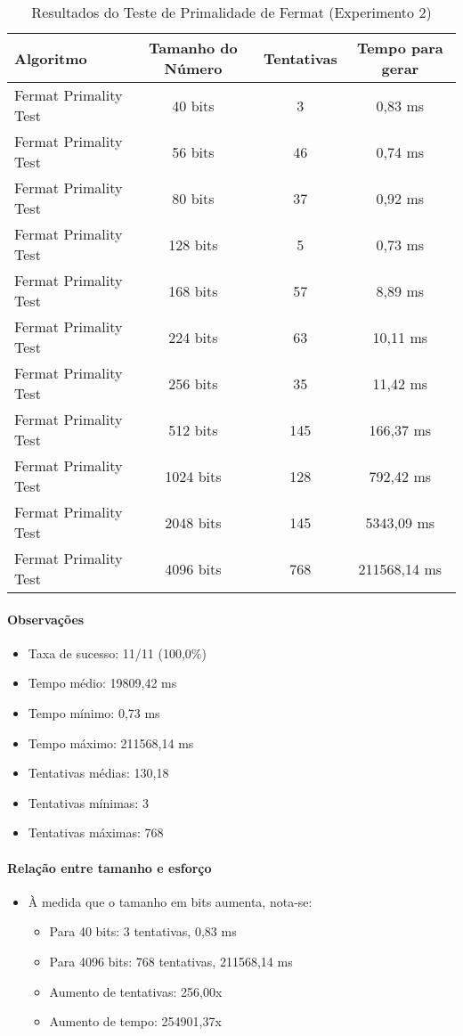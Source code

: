 \begin{table}[H]
\centering
\caption{Resultados do Teste de Primalidade de Fermat (Experimento 2)}
\label{tab:fermat-exp2}
\begin{tabular}{|l|c|c|c|}
\hline
\textbf{Algoritmo} & \textbf{Tamanho do Número} & \textbf{Tentativas} & \textbf{Tempo para gerar} \\
\hline
Fermat Primality Test & 40 bits & 3 & 0,83 ms \\
Fermat Primality Test & 56 bits & 46 & 0,74 ms \\
Fermat Primality Test & 80 bits & 37 & 0,92 ms \\
Fermat Primality Test & 128 bits & 5 & 0,73 ms \\
Fermat Primality Test & 168 bits & 57 & 8,89 ms \\
Fermat Primality Test & 224 bits & 63 & 10,11 ms \\
Fermat Primality Test & 256 bits & 35 & 11,42 ms \\
Fermat Primality Test & 512 bits & 145 & 166,37 ms \\
Fermat Primality Test & 1024 bits & 128 & 792,42 ms \\
Fermat Primality Test & 2048 bits & 145 & 5343,09 ms \\
Fermat Primality Test & 4096 bits & 768 & 211568,14 ms \\
\hline
\end{tabular}
\end{table}

\paragraph{Observações}
\begin{itemize}
    \item Taxa de sucesso: 11/11 (100,0\%)
    \item Tempo médio: 19809,42 ms
    \item Tempo mínimo: 0,73 ms
    \item Tempo máximo: 211568,14 ms
    \item Tentativas médias: 130,18
    \item Tentativas mínimas: 3
    \item Tentativas máximas: 768
\end{itemize}

\paragraph{Relação entre tamanho e esforço}
\begin{itemize}
    \item À medida que o tamanho em bits aumenta, nota-se:
    \begin{itemize}
        \item Para 40 bits: 3 tentativas, 0,83 ms
        \item Para 4096 bits: 768 tentativas, 211568,14 ms
        \item Aumento de tentativas: 256,00x
        \item Aumento de tempo: 254901,37x
    \end{itemize}
\end{itemize}

